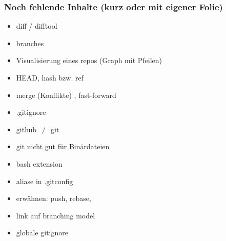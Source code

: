 \documentclass{beamer}
\begin{document}
%
%
%
%


%

%
%
%
%
%
%
%


\begin{frame}[label=gitintro50]
\frametitle{Noch fehlende Inhalte (kurz oder mit eigener Folie)}
\begin{itemize}
\item diff \checkmark / difftool
\item branches \checkmark
\item Visualisierung eines repos (Graph mit Pfeilen) \checkmark
\item HEAD\checkmark , hash bzw. ref
\item merge (Konflikte) \checkmark, fast-forward \checkmark
\item .gitignore
\item github $\neq$ git
\item git nicht gut für Binärdateien
\item bash extension
\item aliase in .gitconfig
\item erwähnen: push,  rebase,
\item link auf branching model
\item globale gitignore

\end{itemize}
\end{frame}
\end{document}
